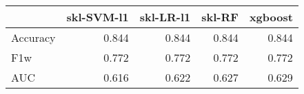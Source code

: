 \begin{tabular}{lrrrr}
\toprule
{} &  skl-SVM-l1 &  skl-LR-l1 &  skl-RF &  xgboost \\
\midrule
Accuracy &       0.844 &      0.844 &   0.844 &    0.844 \\
F1w      &       0.772 &      0.772 &   0.772 &    0.772 \\
AUC      &       0.616 &      0.622 &   0.627 &    0.629 \\
\bottomrule
\end{tabular}
